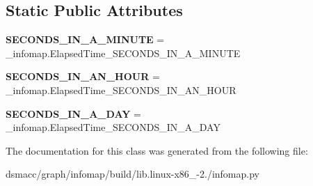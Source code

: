 \subsection*{Static Public Attributes}
\begin{DoxyCompactItemize}
\item 
\mbox{\label{classinfomap_1_1ElapsedTime_ae16fcd62fa7327eddd675b6977e3e19d}} 
{\bfseries S\+E\+C\+O\+N\+D\+S\+\_\+\+I\+N\+\_\+\+A\+\_\+\+M\+I\+N\+U\+TE} = \+\_\+infomap.\+Elapsed\+Time\+\_\+\+S\+E\+C\+O\+N\+D\+S\+\_\+\+I\+N\+\_\+\+A\+\_\+\+M\+I\+N\+U\+TE
\item 
\mbox{\label{classinfomap_1_1ElapsedTime_a27d47201d93af5868008133e53c7ac8b}} 
{\bfseries S\+E\+C\+O\+N\+D\+S\+\_\+\+I\+N\+\_\+\+A\+N\+\_\+\+H\+O\+UR} = \+\_\+infomap.\+Elapsed\+Time\+\_\+\+S\+E\+C\+O\+N\+D\+S\+\_\+\+I\+N\+\_\+\+A\+N\+\_\+\+H\+O\+UR
\item 
\mbox{\label{classinfomap_1_1ElapsedTime_a0c8c2936724d22a88ecbe6f3430cb289}} 
{\bfseries S\+E\+C\+O\+N\+D\+S\+\_\+\+I\+N\+\_\+\+A\+\_\+\+D\+AY} = \+\_\+infomap.\+Elapsed\+Time\+\_\+\+S\+E\+C\+O\+N\+D\+S\+\_\+\+I\+N\+\_\+\+A\+\_\+\+D\+AY
\end{DoxyCompactItemize}


The documentation for this class was generated from the following file\+:\begin{DoxyCompactItemize}
\item 
dsmacc/graph/infomap/build/lib.\+linux-\/x86\+\_-\/2./infomap.\+py\end{DoxyCompactItemize}
